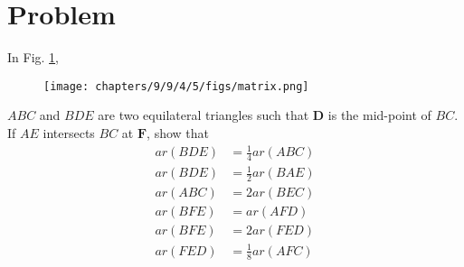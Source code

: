 \documentclass[10pt, a4paper]{article}
\title{\mytitle}
\author{\myauthor\hspace{1em}\\\contact\\FWC22040\hspace{6.5em}IITH\hspace{0.5em}\mymodule\hspace{6em}ASSIGN-5}
\date{}
\let\vec\mathbf
\begin{document}
 \maketitle
 \tableofcontents
   \section{Problem}
   \fi
   In Fig. 
		\ref{fig:9/9/4/5},
	\begin{figure}[H]
		\centering
 \texttt{[image: chapters/9/9/4/5/figs/matrix.png]}
		\caption{}
		\label{fig:9/9/4/5}
  	\end{figure}
$  ABC$ and $BDE$ are two equilateral
triangles such that $\vec{D}$ is the mid-point of $BC$. If $AE$
intersects $BC$ at $\vec{F}$, show that
\begin{align}
	ar(BDE) &=\frac{1}{4} ar(ABC)\\
	ar(BDE) &=\frac{1}{2} ar(BAE)\\
ar(ABC) &=2 ar(BEC)\\
ar(BFE) &= ar(AFD)\\
ar(BFE) &=2ar(FED)\\
	ar(FED) &=\frac{1}{8} ar(AFC)
\end{align}
\iffalse
\end{document}

